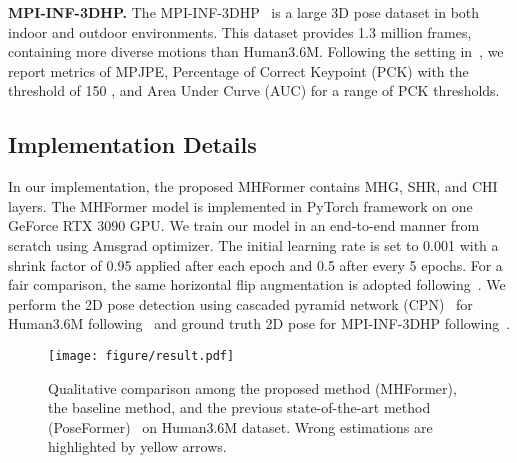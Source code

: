 \documentclass[10pt,twocolumn,letterpaper]{article}
\def\VspaceS{\vspace{-0.30cm}}
\begin{document}
\noindent \textbf{MPI-INF-3DHP.}
The MPI-INF-3DHP~\cite{mehta2017monocular} is a large 3D pose dataset in both indoor and outdoor environments. 
This dataset provides 1.3 million frames, containing more diverse motions than Human3.6M. 
Following the setting in~\cite{mehta2017monocular,lin2019trajectory,chen2021anatomy,poseformer}, we report metrics of MPJPE, Percentage of Correct Keypoint (PCK) with the threshold of 150 , and Area Under Curve (AUC) for a range of PCK thresholds. 

\subsection{Implementation Details}
In our implementation, the proposed MHFormer contains  MHG,  SHR, and  CHI layers. 
The MHFormer model is implemented in PyTorch framework on one GeForce RTX 3090 GPU. 
We train our model in an end-to-end manner from scratch using Amsgrad optimizer. 
The initial learning rate is set to 0.001 with a shrink factor of 0.95 applied after each epoch and 0.5 after every 5 epochs. 
For a fair comparison, the same horizontal flip augmentation is adopted following~\cite{pavllo20193d,cai2019exploiting,chen2021anatomy,poseformer}. 
We perform the 2D pose detection using cascaded pyramid network (CPN)~\cite{chen2018cascaded} for Human3.6M following~\cite{pavllo20193d,cai2019exploiting,liu2020attention} and ground truth 2D pose for MPI-INF-3DHP following~\cite{lin2019trajectory,chen2021anatomy,poseformer}. 

\begin{figure*}[htb]
  \centering
  \texttt{[image: figure/result.pdf]}
  \caption
  {Qualitative comparison among the proposed method (MHFormer), the baseline method, and the previous state-of-the-art method (PoseFormer)~\cite{poseformer} on Human3.6M dataset. 
  Wrong estimations are highlighted by yellow arrows. 
  }
  \label{fig:result}
  \VspaceS
\end{figure*}
\end{document}
